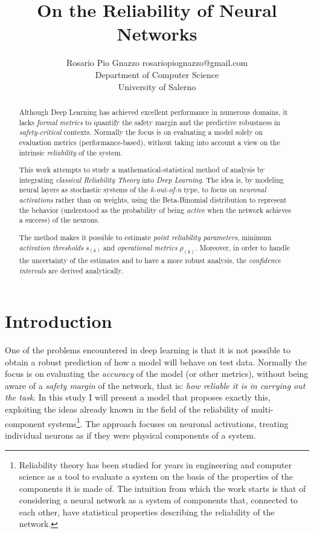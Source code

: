 \documentclass[10pt]{article} %
\title{On the Reliability of Neural Networks}
\author{\name Rosario Pio Gnazzo \email rosariopiognazzo@gmail.com \\
      \addr Department of Computer Science\\
      University of Salerno}
\begin{document}
\maketitle

\begin{abstract}
Although Deep Learning has achieved excellent performance in numerous domains, it lacks \textit{formal metrics} to quantify the safety margin and the predictive robustness in \textit{safety-critical} contexts. Normally the focus is on evaluating a model solely on evaluation metrics (performance-based), without taking into account a view on the intrinsic \textit{reliability} of the system.

This work attempts to study a mathematical-statistical method of analysis by integrating \textit{classical Reliability Theory} into \textit{Deep Learning}. The idea is, by modeling neural layers as stochastic systems of the \textit{k-out-of-n} type, to focus on \textit{neuronal activations} rather than on weights, using the Beta-Binomial distribution to represent the behavior (understood as the probability of being \textit{active} when the network achieves a success) of the neurons.

The method makes it possible to estimate \textit{point reliability parameters}, minimum \textit{activation thresholds} $s_{(k)}$ and \textit{operational metrics} $\rho_{(k)}$. Moreover, in order to handle the uncertainty of the estimates and to have a more robust analysis, the \textit{confidence intervals} are derived analytically.
\end{abstract}

\section{Introduction}
\label{intro}
One of the problems encountered in deep learning is that it is not possible to obtain a robust prediction of how a model will behave on test data. Normally the focus is on evaluating the \textit{accuracy} of the model (or other metrics), without being aware of a \textit{safety margin} of the network, that is: \textit{how reliable it is in carrying out the task}. In this study I will present a model that proposes exactly this, exploiting the ideas already known in the field of the reliability of multi-component systems\footnote{Reliability theory has been studied for years in engineering and computer science as a tool to evaluate a system on the basis of the properties of the components it is made of. The intuition from which the work starts is that of considering a neural network as a system of components that, connected to each other, have statistical properties describing the reliability of the network.}. 
The approach focuses on neuronal activations, treating individual neurons as if they were physical components of a system.
\end{document}
